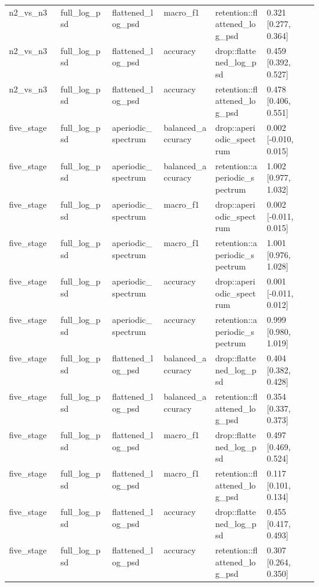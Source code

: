 \begin{longtable}{p{0.10\linewidth}p{0.10\linewidth}p{0.10\linewidth}p{0.10\linewidth}p{0.10\linewidth}p{0.10\linewidth}}
n2\_vs\_n3 & full\_log\_psd & flattened\_log\_psd & macro\_f1 & retention::flattened\_log\_psd & 0.321 [0.277, 0.364]\\
n2\_vs\_n3 & full\_log\_psd & flattened\_log\_psd & accuracy & drop::flattened\_log\_psd & 0.459 [0.392, 0.527]\\
n2\_vs\_n3 & full\_log\_psd & flattened\_log\_psd & accuracy & retention::flattened\_log\_psd & 0.478 [0.406, 0.551]\\
five\_stage & full\_log\_psd & aperiodic\_spectrum & balanced\_accuracy & drop::aperiodic\_spectrum & 0.002 [-0.010, 0.015]\\
five\_stage & full\_log\_psd & aperiodic\_spectrum & balanced\_accuracy & retention::aperiodic\_spectrum & 1.002 [0.977, 1.032]\\
five\_stage & full\_log\_psd & aperiodic\_spectrum & macro\_f1 & drop::aperiodic\_spectrum & 0.002 [-0.011, 0.015]\\
five\_stage & full\_log\_psd & aperiodic\_spectrum & macro\_f1 & retention::aperiodic\_spectrum & 1.001 [0.976, 1.028]\\
five\_stage & full\_log\_psd & aperiodic\_spectrum & accuracy & drop::aperiodic\_spectrum & 0.001 [-0.011, 0.012]\\
five\_stage & full\_log\_psd & aperiodic\_spectrum & accuracy & retention::aperiodic\_spectrum & 0.999 [0.980, 1.019]\\
five\_stage & full\_log\_psd & flattened\_log\_psd & balanced\_accuracy & drop::flattened\_log\_psd & 0.404 [0.382, 0.428]\\
five\_stage & full\_log\_psd & flattened\_log\_psd & balanced\_accuracy & retention::flattened\_log\_psd & 0.354 [0.337, 0.373]\\
five\_stage & full\_log\_psd & flattened\_log\_psd & macro\_f1 & drop::flattened\_log\_psd & 0.497 [0.469, 0.524]\\
five\_stage & full\_log\_psd & flattened\_log\_psd & macro\_f1 & retention::flattened\_log\_psd & 0.117 [0.101, 0.134]\\
five\_stage & full\_log\_psd & flattened\_log\_psd & accuracy & drop::flattened\_log\_psd & 0.455 [0.417, 0.493]\\
five\_stage & full\_log\_psd & flattened\_log\_psd & accuracy & retention::flattened\_log\_psd & 0.307 [0.264, 0.350]\\
\bottomrule
\end{longtable}

